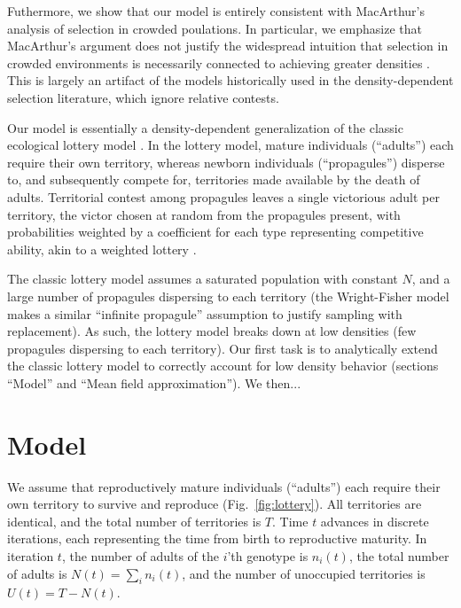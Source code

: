 \documentclass[11pt]{article}
\begin{document}
Futhermore, we show that our model is entirely consistent with MacArthur's analysis of selection in crowded poulations. In particular, we emphasize that MacArthur's argument does not justify the widespread intuition that selection in crowded environments is necessarily connected to achieving greater densities \citep{anderson_1971}. This is largely an artifact of the models historically used in the density-dependent selection literature, which ignore relative contests. 


Our model is essentially a density-dependent generalization of the classic ecological lottery model \cite{chesson_1981}. In the lottery model, mature individuals (``adults'') each require their own territory, whereas newborn individuals (``propagules'') disperse to, and subsequently compete for, territories made available by the death of adults. Territorial contest among propagules leaves a single victorious adult per territory, the victor chosen at random from the propagules present, with probabilities weighted by a coefficient for each type representing competitive ability, akin to a weighted lottery \citep{sale_77}.  

The classic lottery model assumes a saturated population with constant $N$, and a large number of propagules dispersing to each territory (the Wright-Fisher model makes a similar ``infinite propagule'' assumption to justify sampling with replacement). As such, the lottery model breaks down at low densities (few propagules dispersing to each territory). Our first task is to analytically extend the classic lottery model to correctly account for low density behavior (sections ``Model'' and ``Mean field approximation''). We then...

 
\section*{Model}\label{sec:model}

We assume that reproductively mature individuals (``adults'') each require their own territory to survive and reproduce (Fig.~\ref{fig:lottery}). All territories are identical, and the total number of territories is $T$. Time $t$ advances in discrete iterations, each representing the time from birth to reproductive maturity. In iteration $t$, the number of adults of the $i$'th genotype is $n_i(t)$, the total number of adults is $N(t)=\sum_i n_i(t)$, and the number of unoccupied territories is $U(t)=T-N(t)$. 
\end{document}
